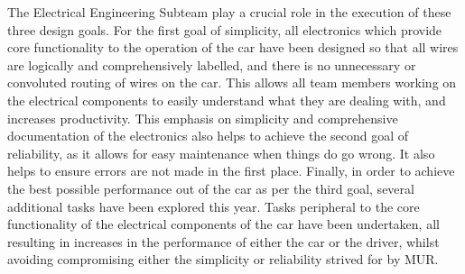 The Electrical Engineering Subteam play a crucial role in the execution of these three design goals. For the first goal of simplicity, all electronics which provide core functionality to the operation of the car have been designed so that all wires are logically and comprehensively labelled, and there is no unnecessary or convoluted routing of wires on the car. This allows all team members working on the electrical components to easily understand what they are dealing with, and increases productivity. This emphasis on simplicity and comprehensive documentation of the electronics also helps to achieve the second goal of reliability, as it allows for easy maintenance when things do go wrong. It also helps to ensure errors are not made in the first place. Finally, in order to achieve the best possible performance out of the car as per the third goal, several additional tasks have been explored this year. Tasks peripheral to the core functionality of the electrical components of the car have been undertaken, all resulting in increases in the performance of either the car or the driver, whilst avoiding compromising either the simplicity or reliability strived for by MUR.
